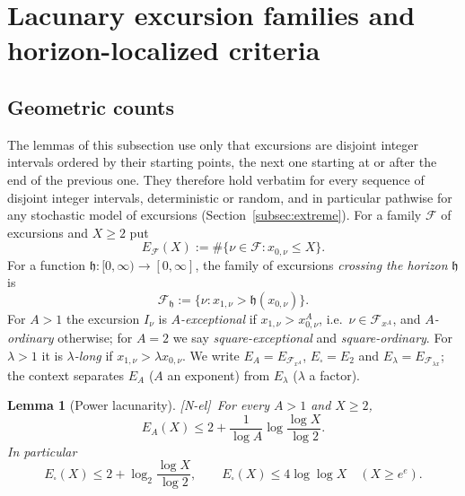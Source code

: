 \documentclass[11pt,reqno]{amsart}
\numberwithin{equation}{section}
\theoremstyle{plain}
\newtheorem{lemma}[theorem]{Lemma}
\theoremstyle{definition}
\theoremstyle{remark}
\newcommand{\F}{\mathcal{F}}
\newcommand{\tagNE}{\textup{[N-el]}}
\begin{document}
\section{Lacunary excursion families and horizon-localized criteria}
\label{sec:lacunary}

\subsection{Geometric counts}
\label{subsec:geometric}

The lemmas of this subsection use only that excursions are disjoint integer
intervals ordered by their starting points, the next one starting at or
after the end of the previous one. They therefore hold verbatim for every
sequence of disjoint integer intervals, deterministic or random, and in
particular pathwise for any stochastic model of excursions
(Section~\ref{subsec:extreme}). For a family $\F$ of excursions and $X\ge2$
put
\begin{equation}
E_\F(X):=\#\{\nu\in\F:x_{0,\nu}\le X\}.
\end{equation}
For a function $\mathfrak h:[0,\infty)\to[0,\infty]$, the family of
excursions \emph{crossing the horizon} $\mathfrak h$ is
\begin{equation}
\F_{\mathfrak h}:=\{\nu:x_{1,\nu}>\mathfrak h(x_{0,\nu})\}.
\end{equation}
For $A>1$ the excursion $I_\nu$ is \emph{$A$-exceptional} if
$x_{1,\nu}>x_{0,\nu}^A$, i.e.\ $\nu\in\F_{x^A}$, and \emph{$A$-ordinary}
otherwise; for $A=2$ we say \emph{square-exceptional} and
\emph{square-ordinary}. For $\lambda>1$ it is \emph{$\lambda$-long} if
$x_{1,\nu}>\lambda x_{0,\nu}$. We write $E_A=E_{\F_{x^A}}$,
$E_\square=E_2$ and $E_\lambda=E_{\F_{\lambda x}}$; the context separates
$E_A$ ($A$ an exponent) from $E_\lambda$ ($\lambda$ a factor).

\begin{lemma}[Power lacunarity]
\label{lem:power-lacunary}
\tagNE\ For every $A>1$ and $X\ge2$,
\begin{equation}
\label{eq:power-lacunary-count}
E_A(X)\le2+\frac1{\log A}\log\frac{\log X}{\log2}.
\end{equation}
In particular
\begin{equation}
\label{eq:square-exception-count}
E_\square(X)\le2+\log_2\frac{\log X}{\log2},\qquad
E_\square(X)\le4\log\log X\quad(X\ge e^e).
\end{equation}
\end{lemma}
\end{document}
